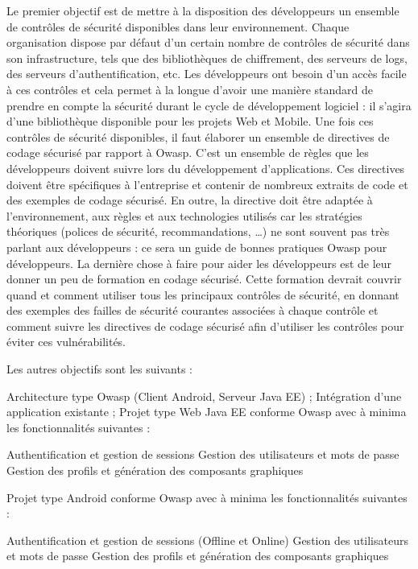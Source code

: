 \begin{itemize}
	\itemcheck Le premier objectif est de mettre à la disposition des développeurs un ensemble de contrôles de sécurité disponibles dans leur environnement. Chaque organisation dispose par défaut d’un certain nombre de contrôles de sécurité dans son infrastructure, tels que des bibliothèques de chiffrement, des serveurs de logs, des serveurs d'authentification, etc. Les développeurs ont besoin d'un accès facile à ces contrôles et cela permet à la longue d’avoir une manière standard de prendre en compte la sécurité durant le cycle de développement logiciel : il s'agira d'une bibliothèque disponible pour les projets Web et Mobile.
	\itemcheck Une fois ces contrôles de sécurité disponibles, il faut élaborer un ensemble de directives de codage sécurisé par rapport à Owasp. C'est un ensemble de règles que les développeurs doivent suivre lors du développement d'applications. Ces directives doivent être spécifiques à l’entreprise et contenir de nombreux extraits de code et des exemples de codage sécurisé. En outre, la directive doit être adaptée à l’environnement, aux règles et aux technologies utilisés car les stratégies théoriques (polices de sécurité, recommandations, …) ne sont souvent pas très parlant aux développeurs : ce sera un guide de bonnes pratiques Owasp pour développeurs.
	\itemcheck La dernière chose à faire pour aider les développeurs est de leur donner un peu de formation en codage sécurisé. Cette formation devrait couvrir quand et comment utiliser tous les principaux contrôles de sécurité, en donnant des exemples des failles de sécurité courantes associées à chaque contrôle et comment suivre les directives de codage sécurisé afin d'utiliser les contrôles pour éviter ces vulnérabilités.
\end{itemize}
Les autres objectifs sont les suivants :
\begin{itemize}
	\itemcheck Architecture type Owasp (Client Android, Serveur Java EE) ;
	\itemcheck Intégration d'une application existante ;
	\itemcheck Projet type Web Java EE conforme Owasp avec à minima les fonctionnalités suivantes :
	\begin{itemize}
		\itemtirait Authentification et gestion de sessions
		\itemtirait Gestion des utilisateurs et mots de passe
		\itemtirait Gestion des profils et génération des composants graphiques
	\end{itemize}
	\itemcheck Projet type Android conforme Owasp avec à minima les fonctionnalités suivantes :
	\begin{itemize}	
		\itemtirait Authentification et gestion de sessions (Offline et Online)
		\itemtirait Gestion des utilisateurs et mots de passe
		\itemtirait Gestion des profils et génération des composants graphiques
	\end{itemize}
\end{itemize}
